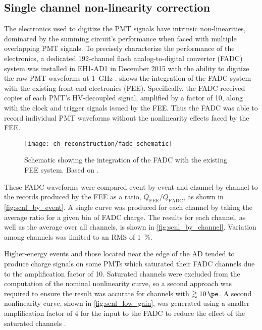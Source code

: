 \subsection{Single channel non-linearity correction}
\label{subsec:scnl}

The electronics used to digitize the PMT signals have intrinsic non-linearities,
dominated by the summing circuit's performance
when faced with multiple overlapping PMT signals.
To precisely characterize the performance of the electronics,
a dedicated 192-channel flash analog-to-digital converter (FADC) system
was installed in EH1-AD1 in December 2015
with the ability to digitize the raw PMT waveforms at \SI{1}{\GHz} \cite{scnl_technote}.
 shows the integration of the FADC system
with the existing front-end electronics (FEE).
Specifically, the FADC received copies of each PMT's HV-decoupled signal,
amplified by a factor of 10,
along with the clock and trigger signals issued by the FEE.
Thus the FADC was able to record individual PMT waveforms
without the nonlinearity effects faced by the FEE.

\begin{figure}
    \centering
    \texttt{[image: ch\_reconstruction/fadc\_schematic]}
    \caption[FADC schematic]{
        Schematic showing the integration of the FADC
        with the existing FEE system.
        Based on \cite{scnl_poster}.
    }
    \label{fig:fadc_schematic}
\end{figure}

These FADC waveforms were compared event-by-event and channel-by-channel
to the records produced by the FEE as a ratio, $Q_\text{FEE}/Q_\text{FADC}$,
as shown in \cref{fig:scnl_by_event}.
A single curve was produced for each channel by taking the average ratio
for a given bin of FADC charge.
The results for each channel, as well as the average over all channels,
is shown in \cref{fig:scnl_by_channel}.
Variation among channels was limited to an RMS of \SI{1}{\percent}.

Higher-energy events and those located near the edge of the AD
tended to produce charge signals on some PMTs which
saturated their FADC channels due to the amplification factor of 10.
Saturated channels were excluded from the computation of the nominal nonlinearity curve,
so a second approach was required to ensure the result was accurate
for channels with $\gtrsim \SI{10}{\pe}$.
A second nonlinearity curve, shown in \cref{fig:scnl_low_gain},
was generated using a smaller amplification factor of 4 for the input to the FADC
to reduce the effect of the saturated channels \cite{scnl_slides}.

